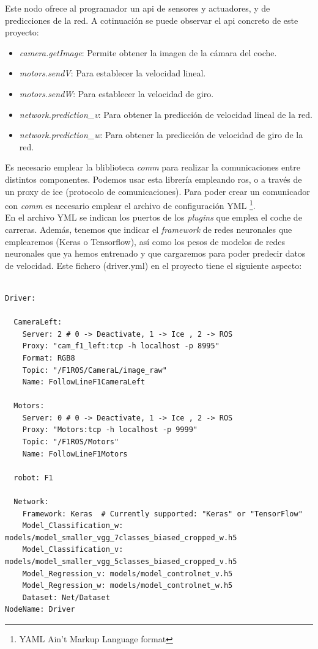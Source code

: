 Este nodo ofrece al programador un \acrfull{api} de sensores y actuadores, y de predicciones de la red. A cotinuación se puede observar el \acrshort{api} concreto de este proyecto:

\begin{itemize}
    \item \textit{camera.getImage}: Permite obtener la imagen de la cámara del coche.
    
    \item \textit{motors.sendV}: Para establecer la velocidad lineal.
    
    \item \textit{motors.sendW}: Para establecer la velocidad de giro.
    
    \item \textit{network.prediction\_v}: Para obtener la predicción de velocidad lineal de la red.
    
    \item \textit{network.prediction\_w}: Para obtener la predicción de velocidad de giro de la red.
\end{itemize}

Es necesario emplear la bliblioteca \textit{comm} para realizar la comunicaciones entre distintos componentes. Podemos usar esta librería empleando \acrshort{ros}, o a través de un proxy de \acrshort{ice} (protocolo de comunicaciones). Para poder crear un comunicador con \textit{comm} es necesario emplear el archivo de configuración YML \footnote{YAML Ain't Markup Language format}.\\

En el archivo YML se indican los puertos de los \textit{plugins} que emplea el coche de carreras. Además, tenemos que indicar el \textit{framework} de redes neuronales que emplearemos (Keras o Tensorflow), así como los pesos de modelos de redes neuronales que ya hemos entrenado y que cargaremos para poder predecir datos de velocidad. Este fichero (driver.yml) en el proyecto tiene el siguiente aspecto:\\


\vspace{10pt}
\begin{lstlisting}

Driver:

  CameraLeft:
    Server: 2 # 0 -> Deactivate, 1 -> Ice , 2 -> ROS
    Proxy: "cam_f1_left:tcp -h localhost -p 8995"
    Format: RGB8
    Topic: "/F1ROS/CameraL/image_raw"
    Name: FollowLineF1CameraLeft

  Motors:
    Server: 0 # 0 -> Deactivate, 1 -> Ice , 2 -> ROS
    Proxy: "Motors:tcp -h localhost -p 9999"
    Topic: "/F1ROS/Motors"
    Name: FollowLineF1Motors

  robot: F1

  Network:
    Framework: Keras  # Currently supported: "Keras" or "TensorFlow"
    Model_Classification_w: models/model_smaller_vgg_7classes_biased_cropped_w.h5
    Model_Classification_v: models/model_smaller_vgg_5classes_biased_cropped_v.h5
    Model_Regression_v: models/model_controlnet_v.h5
    Model_Regression_w: models/model_controlnet_w.h5
    Dataset: Net/Dataset
NodeName: Driver
\end{lstlisting}
\vspace{20pt}

